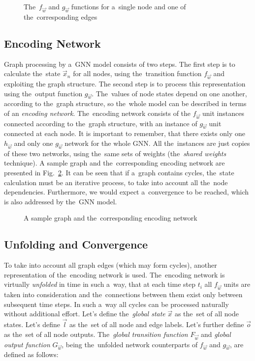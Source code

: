 \documentclass{llncs}
\begin{document}
\begin{figure}[h!]
\begin{center}
	\caption[]{The~$f_{\vec{w}}$ and  $g_{\vec{w}}$ functions for a~single node and one of the~corresponding edges}
	\label{fig:gnn_fg}
\end{center}
\end{figure}


\subsection{Encoding Network}
Graph processing by a~GNN model consists of two steps. The first step is to calculate the~state $\vec{x}_n$ for all nodes, using the~transition function $f_{\vec{w}}$ and exploiting the graph structure. The second step is to process this representation using the~output function $g_{\vec{w}}$. The~values of node states depend on one another, according to the~graph structure, so the~whole model can be described in terms of an \emph{encoding network}. The~encoding network consists of the $f_{\vec{w}}$ unit instances connected according to the~graph structure, with an instance of $g_{\vec{w}}$ unit connected at each node. It is important to remember, that there exists only one $h_{\vec{w}}$ and only one $g_{\vec{w}}$ network for the whole GNN. All the~instances are just copies of these two networks, using the~same sets of weights (the~\emph{shared weights} technique). A sample graph and the~corresponding encoding network are presented in Fig.~\ref{fig:gnn_encoding}. It can be seen that if a~graph contains cycles, the~state calculation must be an iterative process, to take into account all the~node dependencies. Furthermore, we would expect a~convergence to be reached, which is also addressed by the~GNN model.

\begin{figure}[h!]
\begin{center}
	\caption[]{A sample graph and the~corresponding encoding network}
	\label{fig:gnn_encoding}
\end{center}
\end{figure}


\subsection{Unfolding and Convergence}
To take into account all graph edges (which may form cycles), another representation of the~encoding network is used. The~encoding network is virtually \emph{unfolded} in time in such a~way, that at each time step $t_i$ all $f_{\vec{w}}$ units are taken into consideration and the~connections between them exist only between subsequent time steps. In such a~way all cycles can be processed naturally without additional effort. Let's define the~\emph{global state} $\vec{x}$ as the~set of all node states. Let's define $\vec{l}$ as the~set of all node and edge labels. Let's further define $\vec{o}$ as the~set of all node outputs. The~\emph{global transition function} $F_{\vec{w}}$ and \emph{global output function} $G_{\vec{w}}$, being the~unfolded network counterparts of $f_{\vec{w}}$ and $g_{\vec{w}}$, are defined as follows:
\end{document}
